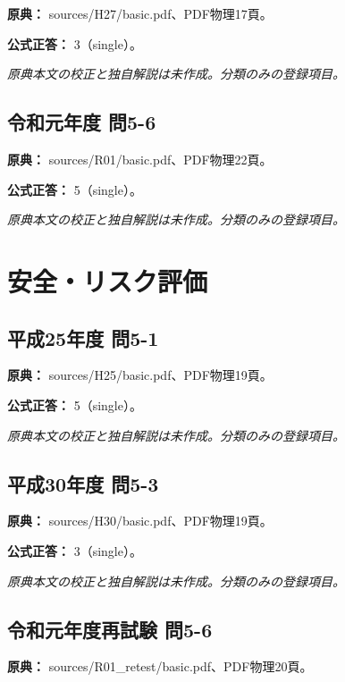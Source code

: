 \noindent\textbf{原典：} sources/H27/basic.pdf、PDF物理17頁。

\textbf{公式正答：} 3（single）。

\par\textit{原典本文の校正と独自解説は未作成。分類のみの登録項目。}

\subsection{令和元年度 問5-6}
\label{q:r01-reg-basic-5-6}

\noindent\textbf{原典：} sources/R01/basic.pdf、PDF物理22頁。

\textbf{公式正答：} 5（single）。

\par\textit{原典本文の校正と独自解説は未作成。分類のみの登録項目。}

\section{安全・リスク評価}

\subsection{平成25年度 問5-1}
\label{q:h25-reg-basic-5-1}

\noindent\textbf{原典：} sources/H25/basic.pdf、PDF物理19頁。

\textbf{公式正答：} 5（single）。

\par\textit{原典本文の校正と独自解説は未作成。分類のみの登録項目。}

\subsection{平成30年度 問5-3}
\label{q:h30-reg-basic-5-3}

\noindent\textbf{原典：} sources/H30/basic.pdf、PDF物理19頁。

\textbf{公式正答：} 3（single）。

\par\textit{原典本文の校正と独自解説は未作成。分類のみの登録項目。}

\subsection{令和元年度再試験 問5-6}
\label{q:r01-ret-basic-5-6}

\noindent\textbf{原典：} sources/R01\_retest/basic.pdf、PDF物理20頁。

